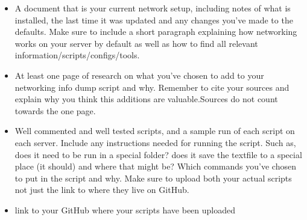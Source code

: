 \documentclass[12pt]{article}
\begin{document}
\begin{itemize}
    \item A  document that is your current network setup, including notes of what is installed, the last time it was updated and any changes you've made to the defaults. Make sure to include a short paragraph explaining how networking works on your server by default as well as how to find all relevant information/scripts/configs/tools.
    \item At least one page of research on what you've chosen to add to your networking info dump script and why.  Remember to cite your sources and explain why you think this additions are valuable.Sources do not count towards the one page.
    \item Well commented and well tested scripts, and a sample run of each script on each server.  Include any instructions needed for running the script.  Such as, does it need to be run in a special folder? does it save the textfile to a special place (it should) and where that might be? Which commands you've chosen to put in the script and why.  Make sure to upload both your actual scripts not just the link to where they live on GitHub.
    \item link to your GitHub where your scripts have been uploaded
\end{itemize}
\end{document}
